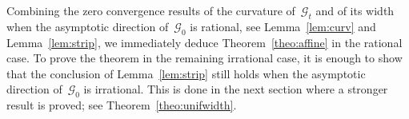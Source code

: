 \documentclass[AHL,Unicode,longabstracts,published]{cedram}
\newcommand{\GG}{\mathcal{G}}
\newcommand{\R}{\mathbb{R}}
\begin{document}
Combining the zero convergence results of the curvature of~$\GG_t$ and of its width when the asymptotic direction of~$\GG_0$ is rational, see Lemma~\ref{lem:curv} and Lemma~\ref{lem:strip}, we immediately deduce Theorem~\ref{theo:affine} in the rational case. To prove the theorem in the remaining irrational case, it is enough to show that the conclusion of Lemma~\ref{lem:strip} still holds when the asymptotic direction of~$\GG_0$ is irrational. This is done in the next section where a stronger result is proved; see Theorem~\ref{theo:unifwidth}.

\end{document}
